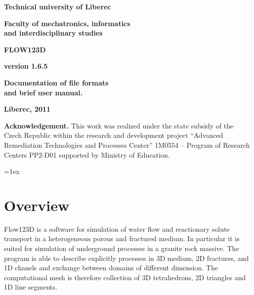 \documentclass[12pt,a4paper]{report}
\begin{document}
\thispagestyle{empty}
\begin{center}
\noindent 
\textbf{\LARGE{
  Technical university of Liberec
}}

\vspace{2ex}
\textbf{\LARGE{
  Faculty of mechatronics, informatics\\
  and interdisciplinary studies
}}

\vspace{160pt}

\textbf{\Huge{
FLOW123D
}}

\vspace{1cm}
\textbf{\Large{
version 1.6.5
}}

\vspace{1cm}

\textbf{\Large{
Documentation of file formats \\
and brief user manual.
}}


\vspace{7cm}

\noindent \textbf{\Large{Liberec, 2011}}

\vspace{1cm}

{\bf Acknowledgement.} This work was realized under the state  subsidy of the Czech Republic within the research and development 
project ``Advanced Remediation Technologies and Processes Center'' 1M0554 
-- Program of Research Centers PP2-D01 supported by Ministry of Education.
\end{center}
\noindent 

\noindent

\tableofcontents
\pagebreak

\parindent=0pt
\parskip=1ex

\chapter{Overview}

Flow123D is a software for simulation of water flow and reactionary solute transport in a heterogeneous 
porous and fractured medium. In particular it is suited for simulation of underground processes in a granite rock massive.
The program is able to describe explicitly processes in 3D medium, 2D fractures, and 1D chanels and exchange between 
domains of different dimension. The computational mesh is therefore collection of 3D tetrahedrons, 2D triangles and 1D line segments.
\end{document}
